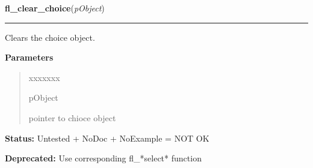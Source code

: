     \label{xformslib:library:fl_clear_choice}

    \vspace{0.5ex}

\hspace{.8\funcindent}\begin{boxedminipage}{\funcwidth}

    \raggedright \textbf{fl\_clear\_choice}(\textit{pObject})

    \vspace{-1.5ex}

    \rule{\textwidth}{0.5\fboxrule}
\setlength{\parskip}{2ex}
    Clears the choice object.

\setlength{\parskip}{1ex}
      \textbf{Parameters}
      \vspace{-1ex}

      \begin{quote}
        \begin{Ventry}{xxxxxxx}

          \item[pObject]

          pointer to chioce object

        \end{Ventry}

      \end{quote}

\textbf{Status:} Untested + NoDoc + NoExample = NOT OK



\textbf{Deprecated:} Use corresponding fl\_*select* function



    \end{boxedminipage}

    \label{xformslib:library:fl_addto_choice}

    \vspace{0.5ex}

